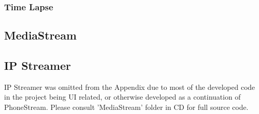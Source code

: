 \vspace{-20pt}
\begin{frame}{}\label{operations}

\end{frame}

%


\subsubsection{Time Lapse}

\vspace{-20pt}
\begin{frame}{}

\end{frame}

\vspace{-20pt}
\begin{frame}{}

\end{frame}


\subsection{MediaStream}
\subsection{IP Streamer}
IP Streamer was omitted from the Appendix due to most of the developed code in the project being UI related, or otherwise developed as a continuation of PhoneStream. Please consult 'MediaStream' folder in CD for full source code.

%
%
%
%
%
%
%

